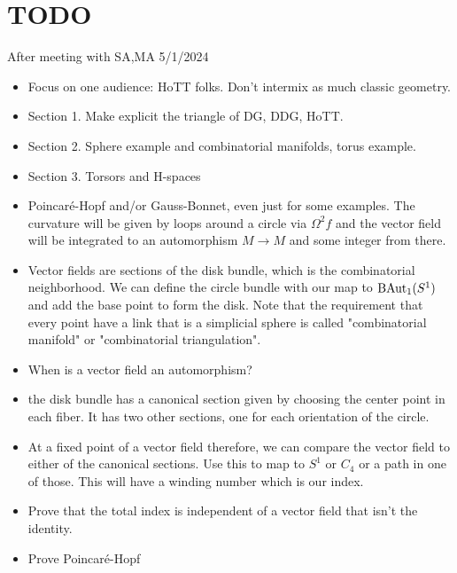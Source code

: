 \documentclass[12pt]{article}
\begin{document}
\section{TODO}
After meeting with SA,MA 5/1/2024
\begin{itemize}
\item Focus on one audience: HoTT folks. Don't intermix as much classic geometry.
\item Section 1. Make explicit the triangle of DG, DDG, HoTT.
\item Section 2. Sphere example and combinatorial manifolds, torus example.
\item Section 3. Torsors and H-spaces
\item Poincaré-Hopf and/or Gauss-Bonnet, even just for some examples. The curvature will be given by loops around a circle via \( \Omega^2 f \) and the vector field will be integrated to an automorphism \( M\to M \) and some integer from there.
\item Vector fields are sections of the disk bundle, which is the combinatorial neighborhood. We can define the circle bundle with our map to \( \mathrm{BAut}_1(S^1) \) and add the base point to form the disk. Note that the requirement that every point have a link that is a simplicial sphere is called "combinatorial manifold" or "combinatorial triangulation".
\item When is a vector field an automorphism?
\item the disk bundle has a canonical section given by choosing the center point in each fiber. It has two other sections, one for each orientation of the circle.
\item At a fixed point of a vector field therefore, we can compare the vector field to either of the canonical sections. Use this to map to \( S^1 \) or \( C_4 \) or a path in one of those. This will have a winding number which is our index.
\item Prove that the total index is independent of a vector field that isn't the identity.
\item Prove Poincaré-Hopf
\end{itemize}
\end{document}
